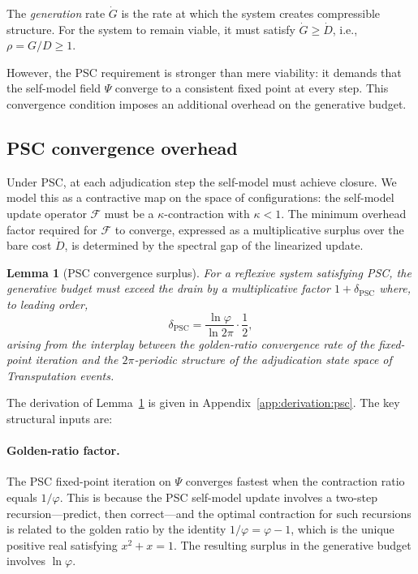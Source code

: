 \documentclass[11pt,twocolumn]{article}
\newtheorem{lemma}[theorem]{Lemma}
\theoremstyle{remark}
\begin{document}
The \emph{generation} rate $\dot{G}$ is the rate at which the system
creates compressible structure. For the system to remain viable, it must
satisfy $\dot{G} \geq \dot{D}$, i.e., $\rho = G/D \geq 1$.

However, the PSC requirement is stronger than mere viability: it demands
that the self-model field $\Psi$ converge to a consistent fixed point at
every step. This convergence condition imposes an additional overhead on
the generative budget.

\subsection{PSC convergence overhead}
\label{sec:deriv:psc}

Under PSC, at each adjudication step the self-model must achieve
closure. We model this as a contractive map on the space of
configurations: the self-model update operator $\mathcal{F}$ must be
a $\kappa$-contraction with $\kappa < 1$. The minimum overhead factor
required for $\mathcal{F}$ to converge, expressed as a multiplicative
surplus over the bare cost $\dot{D}$, is determined by the spectral
gap of the linearized update.

\begin{lemma}[PSC convergence surplus]
\label{lem:psc-surplus}
For a reflexive system satisfying PSC, the generative budget must exceed
the drain by a multiplicative factor $1 + \delta_{\mathrm{PSC}}$ where,
to leading order,
\[
  \delta_{\mathrm{PSC}}
  = \frac{\ln\varphi}{\ln 2\pi} \cdot \frac{1}{2},
\]
arising from the interplay between the golden-ratio convergence rate
of the fixed-point iteration and the $2\pi$-periodic structure of the
adjudication state space of Transputation events.
\end{lemma}

The derivation of Lemma~\ref{lem:psc-surplus} is given in
Appendix~\ref{app:derivation:psc}. The key structural inputs are:

\paragraph{Golden-ratio factor.}
The PSC fixed-point iteration on $\Psi$ converges fastest when the
contraction ratio equals $1/\varphi$. This is because the PSC
self-model update involves a two-step recursion---predict, then
correct---and the optimal contraction for such recursions is related to
the golden ratio by the identity $1/\varphi = \varphi - 1$, which is
the unique positive real satisfying $x^2 + x = 1$. The resulting
surplus in the generative budget involves $\ln\varphi$.
\end{document}
